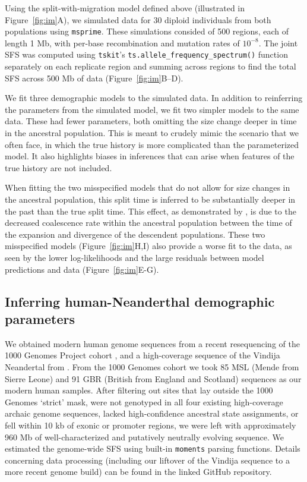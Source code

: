 \documentclass[]{article}
\newcommand{\moments}{\texttt{moments}\xspace}
\newcommand{\msprime}{\texttt{msprime}\xspace}
\newcommand{\tskit}{\texttt{tskit}\xspace}
\begin{document}
Using the split-with-migration model defined above (illustrated in
Figure~\ref{fig:im}A), we simulated data for 30 diploid individuals from both
populations using \msprime \citep{baumdicker2022efficient}. These simulations
consided of 500 regions, each of length 1 Mb, with per-base recombination and
mutation rates of $10^{-8}$. The joint SFS was computed using \tskit's
\texttt{ts.allele\_frequency\_spectrum()} function separately on each replicate
region and summing across regions to find the total SFS across 500 Mb of data
(Figure~\ref{fig:im}B--D).

We fit three demographic models to the simulated data. In addition to
reinferring the parameters from the simulated model, we fit two simpler models
to the same data. These had fewer parameters, both omitting the size change
deeper in time in the ancestral population. This is meant to crudely mimic the
scenario that we often face, in which the true history is more complicated than
the parameterized model. It also highlights biases in inferences that can arise
when features of the true history are not included.

When fitting the two misspecified models that do not allow for size changes in
the ancestral population, this split time is inferred to be substantially
deeper in the past than the true split time. This effect, as demonstrated by
\citet{momigliano2020biases}, is due to the decreased coalescence rate within
the ancestral population between the time of the expansion and divergence of
the descendent populations. These two misspecified models
(Figure~\ref{fig:im}H,I) also provide a worse fit to the data, as seen by the
lower log-likelihoods and the large residuals between model predictions and
data (Figure~\ref{fig:im}E-G).

\subsection*{Inferring human-Neanderthal demographic parameters}

We obtained modern human genome sequences from a recent resequencing of the 1000 Genomes Project cohort \citep{byrska2022high}, and a high-coverage sequence of the Vindija Neandertal from \cite{prufer2017high}. 
From the 1000 Genomes cohort we took 85 MSL (Mende from Sierre Leone) and 91 GBR (British from England and Scotland) sequences as our modern human samples.  
After filtering out sites that lay outside the 1000 Genomes `strict' mask, were not genotyped in all four existing high-coverage archaic genome sequences, lacked high-confidence ancestral state assignments, or fell within 10 kb of exonic or promoter regions, we were left with approximately 960 Mb of well-characterized and putatively neutrally evolving sequence.
We estimated the genome-wide SFS using built-in \moments parsing functions.
Details concerning data processing (including our liftover of the Vindija sequence to a more recent genome build) can be found in the linked GitHub repository. 
\end{document}
